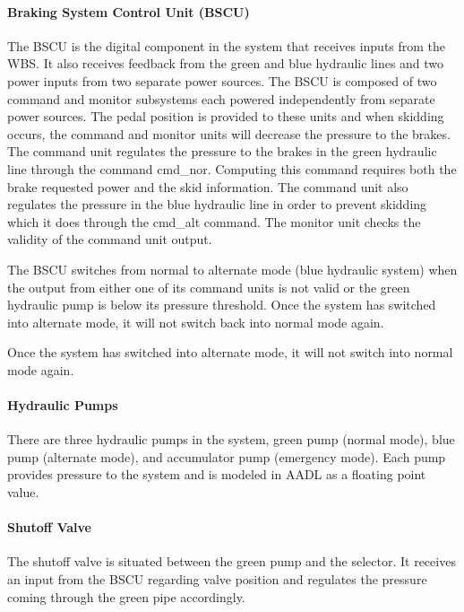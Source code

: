 \paragraph{Braking System Control Unit (BSCU)}
The BSCU is the digital component in the system that receives inputs from the WBS. It also receives feedback from the green and blue hydraulic lines and two power inputs from two separate power sources. The BSCU is composed of two command and monitor subsystems each powered independently from separate power sources. The pedal position is provided to these units and when skidding occurs, the command and monitor units will decrease the pressure to the brakes.
The command unit regulates the pressure to the brakes in the green hydraulic line through the command cmd\_nor. Computing this command requires both the brake requested power and the skid information. The command unit also regulates the pressure in the blue hydraulic line in order to prevent skidding which it does through the cmd\_alt command. The monitor unit checks the validity of the command unit output.

The BSCU switches from normal to alternate mode (blue hydraulic system) when the output from either one of its command units is not valid or the green hydraulic pump is below its pressure threshold.  Once the system has switched into alternate mode, it will not switch back into normal mode again.

\noindent Once the system has switched into alternate mode, it will not switch into normal mode again.

\paragraph{Hydraulic Pumps}
There are three hydraulic pumps in the system, green pump (normal mode), blue pump (alternate mode), and accumulator pump (emergency mode). Each pump provides pressure to the system and is modeled in AADL as a floating point value.

\paragraph{Shutoff Valve}

The shutoff valve is situated between the green pump and the selector. It receives an input from the BSCU regarding valve position and regulates the pressure coming through the green pipe accordingly.


